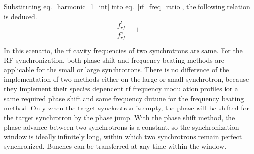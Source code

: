 Substituting eq.~\ref{harmonic_1_int} into eq.~\ref{rf_freq_ratio}, the following relation is deduced. 
\begin{equation} 
\frac{f_{rf}^{l}}{f_{rf}^{s}}= 1\label{frequency_same}
\end{equation}

In this scenario, the rf cavity frequencies of two synchrotrons are same. For the RF synchronization, both phase shift and frequency beating methods are applicable for the small or large synchrotrons. There is no difference of the implementation of two methods either on the large or small synchrotron, because they implement their species dependent rf frequency modulation profiles for a same required phase shift and same frequency dutune for the frequency beating method. Only when the target synchrotron is empty, the phase will be shifted for the target synchrotron by the phase jump. With the phase shift method, the phase advance between two synchrotrons is a constant, so the synchronization window is ideally infinitely long, within which two synchrotrons remain perfect synchronized. Bunches can be transferred at any time within the window.

